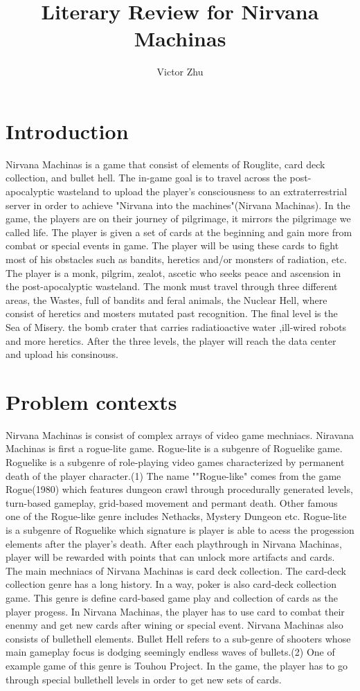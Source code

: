 \documentclass[10pt,twocolumn]{article}
\title{Literary Review for Nirvana Machinas}
\author{Victor Zhu}
\affiliation{Occidental College}
\begin{document}
\maketitle


\section{Introduction}

Nirvana Machinas is a game that consist of elements of Rouglite, card deck collection, and bullet hell. The in-game goal is to travel across the post-apocalyptic wasteland to upload the player’s consciousness to an extraterrestrial server in order to achieve "Nirvana into the machines"(Nirvana Machinas). In the game, the players are on their journey of pilgrimage, it mirrors the pilgrimage we called life. The player is given a set of cards at the beginning and gain more from combat or special events in game. The player will be using these cards to fight most of his obstacles such as bandits, heretics and/or monsters of radiation, etc. The player is a monk, pilgrim, zealot, ascetic who seeks peace and ascension in the post-apocalyptic wasteland. The monk must travel through three different areas, the Wastes, full of bandits and feral animals, the Nuclear Hell, where consist of heretics and mosters mutated past recognition. The final level is the Sea of Misery. the bomb crater that carries radiatioactive water ,ill-wired robots and more heretics. After the three levels, the player will reach the data center and upload his consinouss.
\section{Problem contexts}
Nirvana Machinas is consist of complex arrays of video game mechniacs. Niravana Machinas is first a rogue-lite game. Rogue-lite is a subgenre of Roguelike game. Roguelike is a subgenre of role-playing video games characterized by permanent death of the player character.(1) The name ""Rogue-like" comes from the game Rogue(1980) which features dungeon crawl through procedurally generated levels, turn-based gameplay, grid-based movement and permant death. Other famous one of the Rogue-like genre includes Nethacks, Mystery Dungeon etc. Rogue-lite is a subgenre of Roguelike which signature is player is able to acess the progession elements after the player's death. After each playthrough in Nirvana Machinas, player will be rewarded with points that can unlock more artifacts and cards. The main mechniacs of Nirvana Machinas is card deck collection. The card-deck collection genre has a long history. In a way, poker is also card-deck collection game. This genre is define card-based game play and collection of cards as the player progess. In Nirvana Machinas, the player has to use card to combat their enenmy and get new cards after wining or special event. Nirvana Machinas also consists of bullethell elements. Bullet Hell refers to a sub-genre of shooters whose main gameplay focus is dodging seemingly endless waves of bullets.(2) One of example game of this genre is Touhou Project. In the game, the player has to go through special bullethell levels in order to get new sets of cards.
\end{document}
